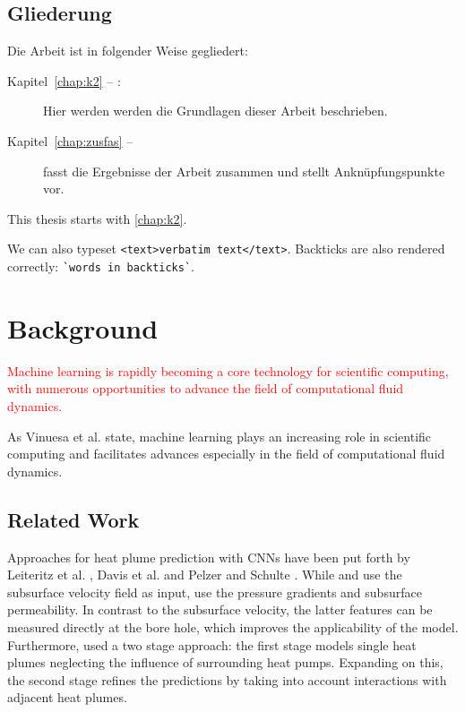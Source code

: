 \documentclass[
  a4paper,  %
  twoside,  %
  bibliography=totoc,
  headsepline,
  cleardoublepage=empty,
  parskip=half,
  draft=false
]{scrbook}
\begin{document}
\section*{Gliederung}
Die Arbeit ist in folgender Weise gegliedert:
\begin{description}
\item[Kapitel~\ref{chap:k2} -- :] Hier werden werden die Grundlagen dieser Arbeit beschrieben.
\item[Kapitel~\ref{chap:zusfas} -- ] fasst die Ergebnisse der Arbeit zusammen und stellt Anknüpfungspunkte vor.
\end{description}




This thesis starts with \cref{chap:k2}.

We can also typeset \verb|<text>verbatim text</text>|.
Backticks are also rendered correctly: \verb|`words in backticks`|.


\chapter{Background}
\textcolor{red}{Machine learning is rapidly becoming a core technology for scientiﬁc computing, with numerous opportunities to advance the ﬁeld of computational ﬂuid dynamics. } \cite{vin2021}

As Vinuesa et al. \cite{vin2021} state, machine learning plays an increasing role in scientific computing and facilitates advances especially in the field of computational fluid dynamics. 
\section{Related Work}
Approaches for heat plume prediction with CNNs have been put forth by Leiteritz et al. \cite{leiteritz2022deep}, Davis et al. \cite{davis2023deep} and Pelzer and Schulte \cite{pelzer2024}. 
While \cite{leiteritz2022deep} and \cite{davis2023deep} use the subsurface velocity field as input, \cite{pelzer2024} use the pressure gradients and subsurface permeability.
In contrast to the subsurface velocity, the latter features can be measured directly at the bore hole, which improves the applicability of the model. Furthermore, \cite{pelzer2024} used a two stage approach: the first stage models single heat plumes neglecting the influence of surrounding heat pumps. Expanding on this, the second stage refines the predictions by taking into account interactions with adjacent heat plumes.
\end{document}
